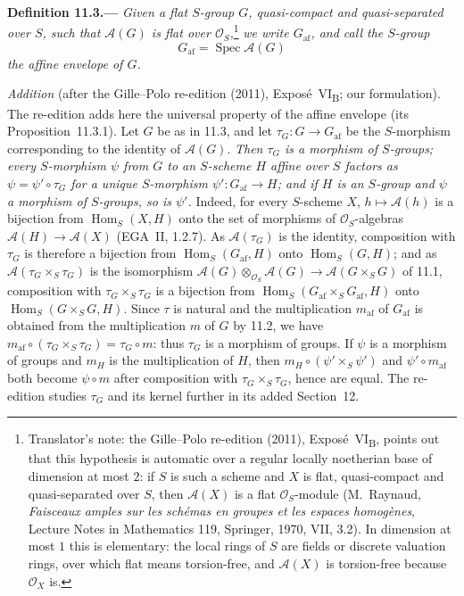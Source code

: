 \medskip
{}\label{def:sga3-VIB-11.3}%
\noindent\textbf{Definition 11.3.---}
\emph{Given a flat \(S\)-group \(G\), quasi-compact and
quasi-separated over \(S\), such that \(\mathcal A(G)\) is
flat over \(\mathcal O_S\),}\footnote{Translator's note: the Gille--Polo re-edition (2011),
Expos\'e~VI\textsubscript{B}, points out that this hypothesis is automatic over a regular locally noetherian
base of dimension at most \(2\): if \(S\) is such a scheme and \(X\) is flat, quasi-compact and quasi-separated
over \(S\), then \(\mathcal A(X)\) is a flat \(\mathcal O_S\)-module (M.~Raynaud, \emph{Faisceaux amples sur les
sch\'emas en groupes et les espaces homog\`enes}, Lecture Notes in Mathematics 119, Springer, 1970, VII, 3.2).
In dimension at most \(1\) this is elementary: the local rings of \(S\) are fields or discrete valuation rings,
over which flat means torsion-free, and \(\mathcal A(X)\) is torsion-free because \(\mathcal O_X\) is.}
\emph{we write \(G_{\mathrm{af}}\), and call the
\(S\)-group}
\[
  G_{\mathrm{af}}=\operatorname{Spec}\mathcal A(G)
\]
\emph{the \emph{affine envelope} of \(G\).}

\par\medskip\noindent
\emph{Addition} (after the Gille--Polo re-edition (2011), Expos\'e~VI\textsubscript{B}; our formulation).
The re-edition adds here the universal property of the affine envelope (its Proposition~11.3.1). Let \(G\) be as
in 11.3, and let \(\tau_G\colon G\to G_{\mathrm{af}}\) be the \(S\)-morphism corresponding to the identity of
\(\mathcal A(G)\). \emph{Then \(\tau_G\) is a morphism of \(S\)-groups; every \(S\)-morphism \(\psi\) from \(G\) to an
\(S\)-scheme \(H\) affine over \(S\) factors as \(\psi=\psi'\circ\tau_G\) for a unique \(S\)-morphism
\(\psi'\colon G_{\mathrm{af}}\to H\); and if \(H\) is an \(S\)-group and \(\psi\) a morphism of \(S\)-groups, so is
\(\psi'\).} Indeed, for every \(S\)-scheme \(X\), \(h\mapsto\mathcal A(h)\) is a bijection from
\(\operatorname{Hom}_S(X,H)\) onto the set of morphisms of \(\mathcal O_S\)-algebras \(\mathcal A(H)\to\mathcal A(X)\)
(EGA~II, 1.2.7). As \(\mathcal A(\tau_G)\) is the identity, composition with \(\tau_G\) is therefore a bijection
from \(\operatorname{Hom}_S(G_{\mathrm{af}},H)\) onto \(\operatorname{Hom}_S(G,H)\); and as
\(\mathcal A(\tau_G\times_S\tau_G)\) is the isomorphism \(\mathcal A(G)\otimes_{\mathcal O_S}\mathcal A(G)\to
\mathcal A(G\times_SG)\) of 11.1, composition with \(\tau_G\times_S\tau_G\) is a bijection from
\(\operatorname{Hom}_S(G_{\mathrm{af}}\times_SG_{\mathrm{af}},H)\) onto \(\operatorname{Hom}_S(G\times_SG,H)\).
Since \(\tau\) is natural and the multiplication \(m_{\mathrm{af}}\) of \(G_{\mathrm{af}}\) is obtained from the
multiplication \(m\) of \(G\) by 11.2, we have \(m_{\mathrm{af}}\circ(\tau_G\times_S\tau_G)=\tau_G\circ m\): thus
\(\tau_G\) is a morphism of groups. If \(\psi\) is a morphism of groups and \(m_H\) is the multiplication of \(H\),
then \(m_H\circ(\psi'\times_S\psi')\) and \(\psi'\circ m_{\mathrm{af}}\) both become \(\psi\circ m\) after composition
with \(\tau_G\times_S\tau_G\), hence are equal. The re-edition studies \(\tau_G\) and its kernel further in its
added Section~12.
